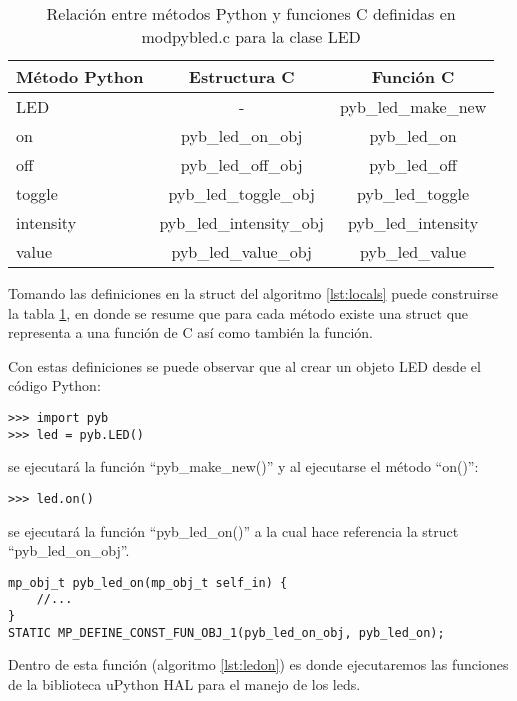 \begin{table}[h]
	\centering
	\caption[Relación entre métodos Python y funciones C]{Relación entre métodos Python y funciones C definidas en modpybled.c para la clase LED}
	\begin{tabular}{l c c}    
		\toprule
		\textbf{Método Python} 	 & \textbf{Estructura C} & \textbf{Función C}  \\
		\midrule
		LED	 				& - 												& pyb\_led\_make\_new \\	
		on	 				& pyb\_led\_on\_obj 				& pyb\_led\_on 					\\		
		off 	 			& pyb\_led\_off\_obj 				& pyb\_led\_off					\\
		toggle	 		& pyb\_led\_toggle\_obj 		& pyb\_led\_toggle			\\
		intensity	 	& pyb\_led\_intensity\_obj 	& pyb\_led\_intensity		\\
		value	 			& pyb\_led\_value\_obj 			&	pyb\_led\_value 			\\
		\bottomrule
		\hline
	\end{tabular}
	\label{tab:methfn}
\end{table}

Tomando las definiciones en la struct del algoritmo \ref{lst:locals} puede construirse la tabla \ref{tab:methfn}, en donde se resume que para cada método existe una struct que representa a una función de C así como también la función.

Con estas definiciones se puede observar que al crear un objeto LED desde el código Python:
\begin{verbatim}
>>> import pyb
>>> led = pyb.LED()
\end{verbatim}

se ejecutará la función “pyb\_make\_new()” y al ejecutarse el método “on()”:
\begin{verbatim}
>>> led.on()
\end{verbatim}

se ejecutará la función “pyb\_led\_on()” a la cual hace referencia la struct “pyb\_led\_on\_obj”.

\begin{lstlisting}[label={lst:ledon},caption=Función que se ejecuta al invocar el método on().] 
mp_obj_t pyb_led_on(mp_obj_t self_in) {
    //...
}
STATIC MP_DEFINE_CONST_FUN_OBJ_1(pyb_led_on_obj, pyb_led_on);
\end{lstlisting}

Dentro de esta función (algoritmo \ref{lst:ledon}) es donde ejecutaremos las funciones de la biblioteca uPython HAL para el manejo de los leds.

